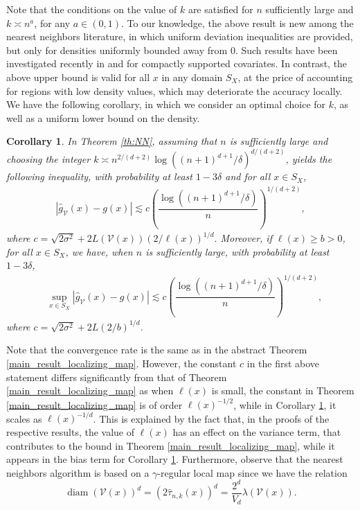 \documentclass[paper=a4, fontsize=11pt]{scrartcl}
\newcommand{\diam}{\operatorname{diam}}
\newtheorem{corollary}[theorem]{Corollary}
\begin{document}
Note that the conditions on the value of $k$ are satisfied for $n$ sufficiently large   and $k\asymp n^a $, for any $a\in (0,1)$. 
To our knowledge, the above result is new among the nearest neighbors literature, in which uniform deviation inequalities are provided, but only for densities uniformly bounded away from $0$. Such results have been investigated recently in \cite{jiang2019non} and \cite{portier2021nearest} for compactly supported covariates. In contrast, the above upper bound is valid for all $x$ in any domain $S_X$, at the price of accounting for regions with low density values, which may deteriorate the accuracy locally. We have the following corollary, in which we consider an optimal choice for $k$, as well as a uniform lower bound on the density.


\begin{corollary}\label{corknn}
In Theorem \ref{th:NN}, assuming that $ n $ is sufficiently large and choosing the integer $k \asymp n^{2/(d+2)} \log((n+1)^{d+1}/\delta)^{d/(d+2)}$, yields the following inequality, with probability at least $1-3\delta$ and for all $x\in S_X$, 
   \begin{align*}
      |\hat g_{\mathcal V}(x) - g(x) |  \lesssim c \left( \dfrac{\log((n+1)^{d+1}/\delta)}{n}\right)^{1/(d+2)},
   \end{align*}
    where $c =   \sqrt{2\sigma^2} + 2 L(\mathcal{V}(x)) \left({2}/\ell(x) \right)^{1/d}.$  Moreover, if $\ell(x) \geq b >0 $, for all $x\in S_X$,  we have, when $n$ is sufficiently large, with probability at least $1 - 3\delta $,
 \begin{align*}
        & \sup_{x\in S_X} | \hat g_{\mathcal V}(x) - g(x)| \lesssim c \left( \dfrac{\log((n+1)^{d+1}/\delta)}{n}\right)^{1/(d+2)},
    \end{align*}
   where $c =   \sqrt{2\sigma^2} + 2 L \left(2/b \right)^{1/d}$.
\end{corollary}


Note that the convergence rate is the same as in the abstract Theorem \ref{main_result_localizing_map}. However, the constant $c$ in the first above statement differs significantly from that of Theorem  \ref{main_result_localizing_map} as when $\ell(x)$ is small, the constant in Theorem \ref{main_result_localizing_map} is of order \( { \ell(x) } ^{-1/2} \), while in Corollary \ref{corknn}, it scales as \(  \ell(x) ^{-1/d} \). This is explained by the fact that, in the proofs of the respective results, the value of $\ell(x)$ has an effect on the variance term, that contributes to the bound in Theorem \ref{main_result_localizing_map}, while it appears in the bias term for Corollary \ref{corknn}. Furthermore, observe that the nearest neighbors algorithm is based on a $\gamma$-regular local map since we have the relation $$\diam(\mathcal{V}(x))^d = (2 \hat \tau _{n,k}(x))^d = \dfrac{2^d}{V_d} \lambda(\mathcal{V}(x)).$$
\end{document}
